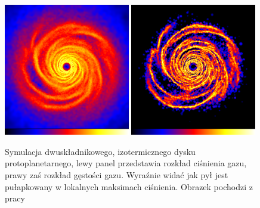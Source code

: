 \begin{figure}
   \centering
   \includegraphics[width=0.49\textwidth]{figures/chap1_gasdisk.png}
   \includegraphics[width=0.49\textwidth]{figures/chap1_dustdisk.png}
   \caption{Symulacja dwuskładnikowego, izotermicznego dysku protoplanetarnego,
      lewy panel przedstawia rozkład ciśnienia gazu, prawy zaś rozkład gęstości
      gazu.  Wyraźnie widać jak pył jest pułapkowany w lokalnych maksimach
      ciśnienia. Obrazek pochodzi z pracy~\cite{RLP2006}}
   \label{fig:chap1_drift}
\end{figure}

